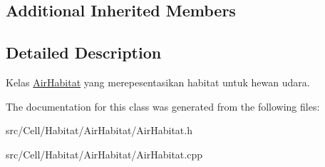 \subsection*{Additional Inherited Members}


\subsection{Detailed Description}
Kelas \hyperlink{classAirHabitat}{Air\+Habitat} yang merepesentasikan habitat untuk hewan udara. 

The documentation for this class was generated from the following files\+:\begin{DoxyCompactItemize}
\item 
src/\+Cell/\+Habitat/\+Air\+Habitat/Air\+Habitat.\+h\item 
src/\+Cell/\+Habitat/\+Air\+Habitat/Air\+Habitat.\+cpp\end{DoxyCompactItemize}
